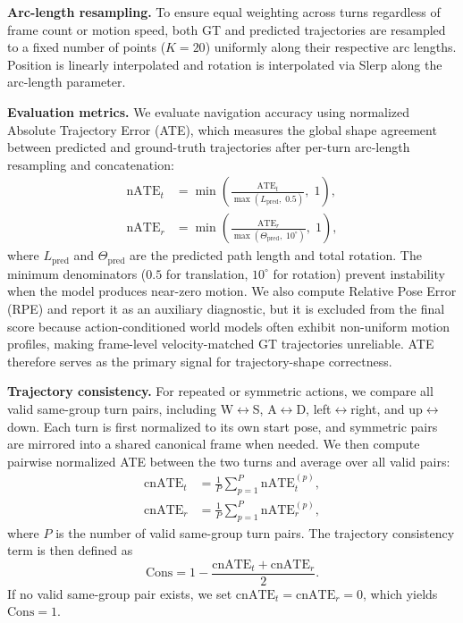 \documentclass{llmxive}
\providecommand{\myparagraph}[1]{\vspace{-0.1em}\noindent\textbf{#1}\hspace{0.3em}}
\begin{document}
\myparagraph{Arc-length resampling.}
To ensure equal weighting across turns regardless of frame count or motion speed, both GT and predicted trajectories are resampled to a fixed number of points ($K = 20$) uniformly along their respective arc lengths.
Position is linearly interpolated and rotation is interpolated via Slerp along the arc-length parameter.

\myparagraph{Evaluation metrics.}
We evaluate navigation accuracy using normalized Absolute Trajectory Error (ATE), which measures the global shape agreement between predicted and ground-truth trajectories after per-turn arc-length resampling and concatenation:
\begin{align}
  \mathrm{nATE}_t &= \min\!\left(\frac{\mathrm{ATE}_t}{\max(L_{\mathrm{pred}},\; 0.5)},\; 1\right), \label{eq:nate_t} \\
  \mathrm{nATE}_r &= \min\!\left(\frac{\mathrm{ATE}_r}{\max(\Theta_{\mathrm{pred}},\; 10^\circ)},\; 1\right),
\end{align}
where $L_{\mathrm{pred}}$ and $\Theta_{\mathrm{pred}}$ are the predicted path length and total rotation.
The minimum denominators ($0.5$ for translation, $10^\circ$ for rotation) prevent instability when the model produces near-zero motion.
We also compute Relative Pose Error (RPE) and report it as an auxiliary diagnostic, but it is excluded from the final score because action-conditioned world models often exhibit non-uniform motion profiles, making frame-level velocity-matched GT trajectories unreliable.
ATE therefore serves as the primary signal for trajectory-shape correctness.

\myparagraph{Trajectory consistency.}
For repeated or symmetric actions, we compare all valid same-group turn pairs, including W$\leftrightarrow$S, A$\leftrightarrow$D, left$\leftrightarrow$right, and up$\leftrightarrow$down.
Each turn is first normalized to its own start pose, and symmetric pairs are mirrored into a shared canonical frame when needed.
We then compute pairwise normalized ATE between the two turns and average over all valid pairs:
\begin{align}
  \mathrm{cnATE}_t &= \frac{1}{P}\sum_{p=1}^{P} \mathrm{nATE}^{(p)}_t, \\
  \mathrm{cnATE}_r &= \frac{1}{P}\sum_{p=1}^{P} \mathrm{nATE}^{(p)}_r,
\end{align}
where $P$ is the number of valid same-group turn pairs.
The trajectory consistency term is then defined as
\begin{equation}
  \mathrm{Cons} = 1 - \frac{\mathrm{cnATE}_t + \mathrm{cnATE}_r}{2}.
\end{equation}
If no valid same-group pair exists, we set $\mathrm{cnATE}_t = \mathrm{cnATE}_r = 0$, which yields $\mathrm{Cons} = 1$.
\end{document}
